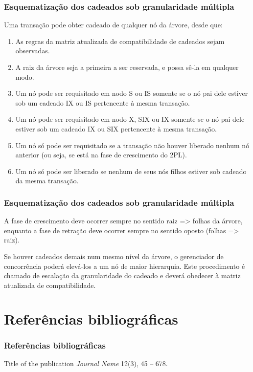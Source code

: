 \documentclass{beamer}
\begin{document}

\begin{frame}
    \frametitle{Esquematização dos cadeados sob granularidade múltipla}
    
    Uma transação pode obter cadeado de qualquer nó da árvore, desde que:
    
    \begin{enumerate}
        \item As regras da matriz atualizada de compatibilidade de cadeados sejam observadas.
        \item A raiz da árvore seja a primeira a ser reservada, e possa sê-la em qualquer modo.
        \item Um nó pode ser requisitado em nodo S ou IS somente se o nó pai dele estiver sob um cadeado IX ou IS pertencente à mesma transação.
        \item Um nó pode ser requisitado em nodo X, SIX ou IX somente se o nó pai dele estiver sob um cadeado IX ou SIX pertencente à mesma transação.
        \item Um nó só pode ser requisitado se a transação não houver liberado nenhum nó anterior (ou seja, se está na fase de crescimento do 2PL).
        \item Um nó só pode ser liberado se nenhum de seus nós filhos estiver sob cadeado da mesma transação.
    \end{enumerate}
    
\end{frame}


\begin{frame}
    \frametitle{Esquematização dos cadeados sob granularidade múltipla}
    
    A fase de crescimento deve ocorrer sempre no sentido raiz => folhas da árvore, enquanto a fase de retração deve ocorrer sempre no sentido oposto (folhas => raiz).

    Se houver cadeados demais num mesmo nível da árvore, o gerenciador de concorrência poderá elevá-los a um nó de maior hierarquia. Este procedimento é chamado de escalação da granularidade do cadeado e deverá obedecer à matriz atualizada de compatibilidade.
\end{frame}


\section{Referências bibliográficas}
\begin{frame}
    \frametitle{Referências bibliográficas}
    \footnotesize{
    \begin{thebibliography}{99} %
    \newblock Title of the publication
    \newblock \emph{Journal Name} 12(3), 45 -- 678.
    \end{thebibliography}
    }
\end{frame}

\end{document}
